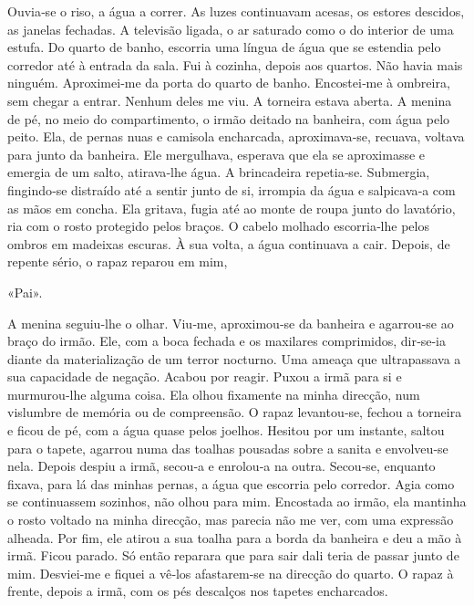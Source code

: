 Ouvia­‑se o riso, a água a correr. As luzes continuavam acesas, os
estores descidos, as janelas fechadas. A televisão ligada, o ar saturado
como o do interior de uma estufa. Do quarto de banho, escorria uma
língua de água que se estendia pelo corredor até à entrada da sala. Fui
à cozinha, depois aos quartos. Não havia mais ninguém. Aproximei­‑me da
porta do quarto de banho. Encostei­‑me à ombreira, sem chegar a entrar.
Nenhum deles me viu. A torneira estava aberta. A menina de pé, no meio
do compartimento, o irmão deitado na banheira, com água pelo peito. Ela,
de pernas nuas e camisola encharcada, aproximava­‑se, recuava, voltava
para junto da banheira. Ele mergulhava, esperava que ela se aproximasse
e emergia de um salto, atirava­‑lhe água. A brincadeira repetia­‑se.
Submergia, fingindo­‑se distraído até a sentir junto de si, irrompia da
água e salpicava­‑a com as mãos em concha. Ela gritava, fugia até ao
monte de roupa junto do lavatório, ria com o rosto protegido pelos
braços. O cabelo molhado escorria­‑lhe pelos ombros em madeixas escuras.
À sua volta, a água continuava a cair. Depois, de repente sério, o rapaz
reparou em mim,

«Pai».

A menina seguiu­‑lhe o olhar. Viu­‑me, aproximou­‑se da banheira e
agarrou­‑se ao braço do irmão. Ele, com a boca fechada e os maxilares
comprimidos, dir­‑se­‑ia diante da materialização de um terror nocturno.
Uma ameaça que ultrapassava a sua capacidade de negação. Acabou por
reagir. Puxou a irmã para si e murmurou­‑lhe alguma coisa. Ela olhou
fixamente na minha direcção, num vislumbre de memória ou de compreensão.
O rapaz levantou­‑se, fechou a torneira e ficou de pé, com a água quase
pelos joelhos. Hesitou por um instante, saltou para o tapete, agarrou
numa das toalhas pousadas sobre a sanita e envolveu­‑se nela. Depois
despiu a irmã, secou­‑a e enrolou­‑a na outra. Secou­‑se, enquanto
fixava, para lá das minhas pernas, a água que escorria pelo corredor.
Agia como se continuassem sozinhos, não olhou para mim. Encostada ao
irmão, ela mantinha o rosto voltado na minha direcção, mas parecia não
me ver, com uma expressão alheada. Por fim, ele atirou a sua toalha para
a borda da banheira e deu a mão à irmã. Ficou parado. Só então reparara
que para sair dali teria de passar junto de mim. Desviei­‑me e fiquei a
vê­‑los afastarem­‑se na direcção do quarto. O rapaz à frente, depois a
irmã, com os pés descalços nos tapetes encharcados.

